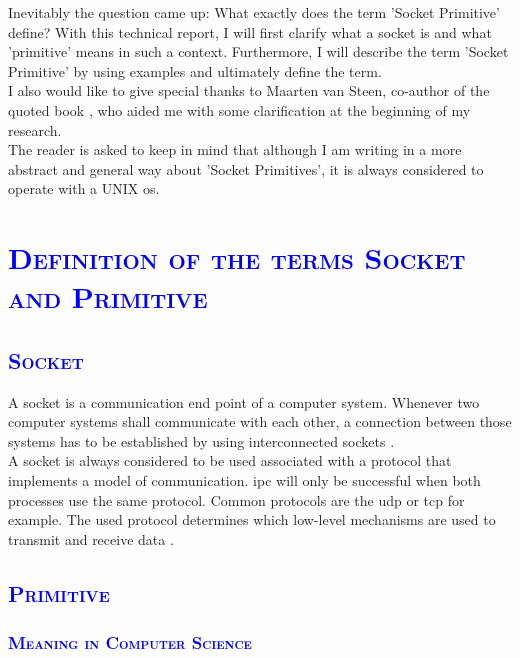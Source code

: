 \documentclass[xcolor=dvipsnames]{article}
\begin{document}
\noindent Inevitably the question came up: What exactly does the term 'Socket Primitive' define?  With this technical report, I will first clarify what a socket is and what 'primitive' means in such a context. Furthermore, I will describe the term 'Socket Primitive' by using examples and ultimately define the term.\\

\noindent I also would like to give special thanks to Maarten van Steen, co-author of the quoted book \cite{tanenbaum}, who aided me with some clarification at the beginning of my research.\\

\noindent The reader is asked to keep in mind that although I am writing in a more abstract and general way about 'Socket Primitives', it is always considered to operate with a UNIX \gls{os}.

\section{\scshape{\textcolor{blue}{Definition of the terms Socket and Primitive}}}

\subsection{\scshape{\textcolor{blue}{Socket}}}\label{introduction_socket}

A socket is a communication end point of a computer system. Whenever two computer systems shall communicate with each other, a connection between those systems has to be established by using interconnected sockets \cite[p. 553, ch. 6.5.2]{computer_networks}.\\

\noindent A socket is always considered to be used associated with a protocol that implements a model of communication. \gls{ipc} will only be successful when both processes use the same protocol. Common protocols are the \gls{udp} or \gls{tcp} for example. The used protocol determines which low-level mechanisms are used to transmit and receive data \cite[p. 427 - 427, ch. 16]{GNU_C_library_manual}.

\subsection{\scshape{\textcolor{blue}{Primitive}}}

\subsubsection{\scshape{\textcolor{blue}{Meaning in Computer Science}}}
\end{document}
